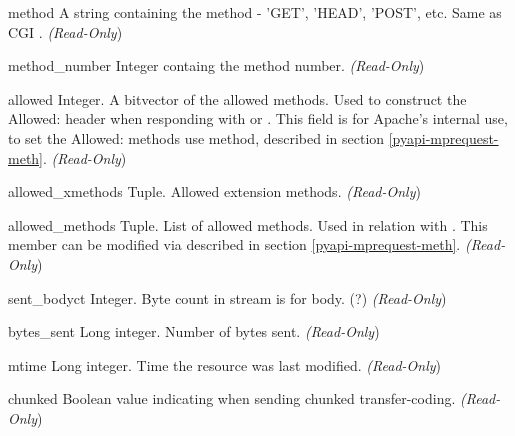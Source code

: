\begin{memberdesc}[Request]{method}
A string containing the method - 'GET', 'HEAD', 'POST', etc.
Same as CGI .
\emph{(Read-Only})
\end{memberdesc}

\begin{memberdesc}[Request]{method_number}
Integer containg the method number.
\emph{(Read-Only})
\end{memberdesc}

\begin{memberdesc}[Request]{allowed}
Integer. A bitvector of the allowed methods. Used to construct the
Allowed: header when responding with
 or
. This field is for Apache's internal
use, to set the Allowed: methods use 
method, described in section \ref{pyapi-mprequest-meth}. 
\emph{(Read-Only})
\end{memberdesc}

\begin{memberdesc}[Request]{allowed_xmethods}
Tuple. Allowed extension methods.
\emph{(Read-Only})
\end{memberdesc}

\begin{memberdesc}[Request]{allowed_methods}
Tuple. List of allowed methods. Used in relation with
. This member can be modified via  
described in section \ref{pyapi-mprequest-meth}.
\emph{(Read-Only})
\end{memberdesc}

\begin{memberdesc}[Request]{sent_bodyct}
Integer. Byte count in stream is for body. (?)
\emph{(Read-Only})
\end{memberdesc}

\begin{memberdesc}[Request]{bytes_sent}
Long integer. Number of bytes sent.
\emph{(Read-Only})
\end{memberdesc}

\begin{memberdesc}[Request]{mtime}
Long integer. Time the resource was last modified.
\emph{(Read-Only})
\end{memberdesc}

\begin{memberdesc}[Request]{chunked}
Boolean value indicating when sending chunked transfer-coding.
\emph{(Read-Only})
\end{memberdesc}


